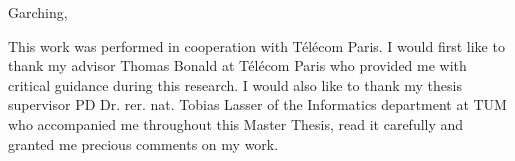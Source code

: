 \documentclass[IN, 11pt, twoside, openright, master, english]{tumthesis}
\begin{document}
Garching, 


\begin{otherlanguage}{ngerman}
	\begin{abstract}
		
	\end{abstract}
\end{otherlanguage}

\begin{abstract}
	
\end{abstract}


\newpage


\begin{thanks}
	This work was performed in cooperation with Télécom Paris. I would first like to thank my advisor Thomas Bonald at Télécom Paris who provided me with critical guidance during this research. I would also like to thank my thesis supervisor PD Dr. rer. nat. Tobias Lasser of the Informatics department at TUM who accompanied me throughout this Master Thesis, read it carefully and granted me precious comments on my work.
\end{thanks}

\let\cleardoublepage\clearpage

\tableofcontents
\listoffigures
\listoftables





\pagestyle{headings}

\startcontent








%

\printbibliography[heading=bibintoc]

\clearpage
\pagestyle{empty}
\end{document}
